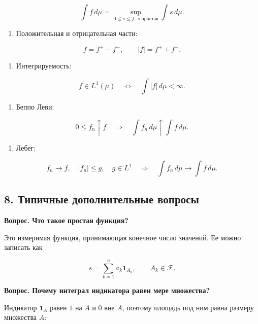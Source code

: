 \documentclass[
  11pt,
  a4paper,
]{article}
\providecommand{\tightlist}{%
  \setlength{\itemsep}{0pt}\setlength{\parskip}{0pt}}
\begin{document}
\[
\int f\,d\mu
=
\sup_{0\le s\le f,\ s\text{ простая}}
\int s\,d\mu.
\]

\begin{enumerate}
\def\labelenumi{\arabic{enumi}.}
\setcounter{enumi}{3}
\tightlist
\item
  Положительная и отрицательная части:
\end{enumerate}

\[
f=f^+-f^-,
\qquad
|f|=f^++f^-.
\]

\begin{enumerate}
\def\labelenumi{\arabic{enumi}.}
\setcounter{enumi}{4}
\tightlist
\item
  Интегрируемость:
\end{enumerate}

\[
f\in L^1(\mu)
\quad\Longleftrightarrow\quad
\int |f|\,d\mu<\infty.
\]

\begin{enumerate}
\def\labelenumi{\arabic{enumi}.}
\setcounter{enumi}{5}
\tightlist
\item
  Беппо Леви:
\end{enumerate}

\[
0\le f_n\uparrow f
\quad\Longrightarrow\quad
\int f_n\,d\mu\uparrow\int f\,d\mu.
\]

\begin{enumerate}
\def\labelenumi{\arabic{enumi}.}
\setcounter{enumi}{6}
\tightlist
\item
  Лебег:
\end{enumerate}

\[
f_n\to f,\quad |f_n|\le g,\quad g\in L^1
\quad\Longrightarrow\quad
\int f_n\,d\mu\to\int f\,d\mu.
\]

\subsection{8. Типичные дополнительные
вопросы}\label{ux442ux438ux43fux438ux447ux43dux44bux435-ux434ux43eux43fux43eux43bux43dux438ux442ux435ux43bux44cux43dux44bux435-ux432ux43eux43fux440ux43eux441ux44b}

\textbf{Вопрос. Что такое простая функция?}

Это измеримая функция, принимающая конечное число значений. Ее можно
записать как

\[
s=\sum_{k=1}^n a_k\mathbf 1_{A_k},
\qquad A_k\in\mathcal F.
\]

\textbf{Вопрос. Почему интеграл индикатора равен мере множества?}

Индикатор \(\mathbf 1_A\) равен \(1\) на \(A\) и \(0\) вне \(A\),
поэтому площадь под ним равна размеру множества \(A\):
\end{document}
